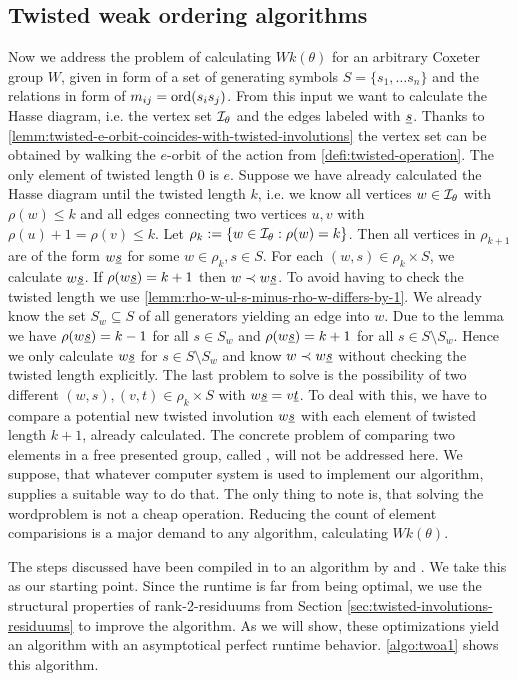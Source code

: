 \subsection{Twisted weak ordering algorithms}
\label{sec:twisted-involutions-algorithms}

Now we address the problem of calculating $Wk(\theta)$ for an arbitrary Coxeter group $W$, given in form of a set of generating symbols $S = \{s_1, \ldots s_n\}$ and the relations in form of $m_{ij} = \operatorname{ord}(s_i s_j)$. From this input we want to calculate the Hasse diagram, i.e. the vertex set $\mathcal{I}_{\theta}$ and the edges labeled with $\underline{s}$. Thanks to \ref{lemm:twisted-e-orbit-coincides-with-twisted-involutions} the vertex set can be obtained by walking the $e$-orbit of the action from \ref{defi:twisted-operation}. The only element of twisted length 0 is $e$. Suppose we have already calculated the Hasse diagram until the twisted length $k$, i.e. we know all vertices $w \in \mathcal{I}_{\theta}$ with $\rho(w) \leq k$ and all edges connecting two vertices $u,v$ with $\rho(u) + 1 = \rho(v) \leq k$. Let $\rho_k := \{ w \in \mathcal{I}_{\theta} : \rho(w) = k \}$. Then all vertices in $\rho_{k+1}$ are of the form $w \underline{s}$ for some $w \in \rho_k, s \in S$. For each $(w,s) \in \rho_k \times S$, we calculate $w \underline{s}$. If $\rho(w \underline{s}) = k + 1$ then $w \prec w \underline{s}$. To avoid having to check the twisted length we use \ref{lemm:rho-w-ul-s-minus-rho-w-differs-by-1}. We already know the set $S_w \subseteq S$ of all generators yielding an edge into $w$. Due to the lemma we have $\rho(w \underline{s}) = k - 1$ for all $s \in S_w$ and $\rho(w \underline{s}) = k + 1$ for all $s \in S \setminus S_w$. Hence we only calculate $w \underline{s}$ for $s \in S \setminus S_w$ and know $w \prec w \underline{s}$ without checking the twisted length explicitly. The last problem to solve is the possibility of two different $(w,s),(v,t) \in \rho_k \times S$ with $w \underline{s} = v \underline{t}$. To deal with this, we have to compare a potential new twisted involution $w \underline{s}$ with each element of twisted length $k+1$, already calculated. The concrete problem of comparing two elements in a free presented group, called , will not be addressed here. We suppose, that whatever computer system is used to implement our algorithm, supplies a suitable way to do that. The only thing to note is, that solving the wordproblem is not a cheap operation. Reducing the count of element comparisions is a major demand to any algorithm, calculating $Wk(\theta)$.

The steps discussed have been compiled in to an algorithm by \cite[Algorithm 2.4]{brennemann:twoa} and \cite[Algorithm 3.1.1]{haas:twoa}. We take this as our starting point. Since the runtime is far from being optimal, we use the structural properties of rank-2-residuums from Section \ref{sec:twisted-involutions-residuums} to improve the algorithm. As we will show, these optimizations yield an algorithm with an asymptotical perfect runtime behavior. \ref{algo:twoa1} shows this algorithm.

